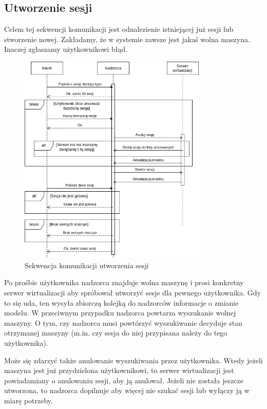 \documentclass[../opis-rozwiazania.tex]{subfiles}
\begin{document}
\label{communication-sec}

\subsection{Utworzenie sesji}

Celem tej sekwencji komunikacji jest odnalezienie istniejącej już sesji lub stworzenie nowej.
Zakładamy, że w systemie zawsze jest jakaś wolna maszyna.
Inaczej zgłaszamy użytkownikowi błąd.

\begin{figure}[H]
    \centering
    \includegraphics[width=0.8\textwidth]{../diagrams/sequence_diagrams/tworzenie_sesji.png}
    \caption{Sekwencja komunikacji utworzenia sesji}
    \label{figure:diagrams:sequence_diagrams:tworzenie_sesji}
\end{figure}

Po prośbie użytkownika nadzorca znajduje wolna maszynę i prosi konkretny serwer wirtualizacji aby spróbował utworzyć sesje dla pewnego użytkownika.
Gdy to się uda, ten wysyła zbiorczą kolejką do nadzorców informacje o zmianie modelu.
W przeciwnym przypadku nadzorca powtarza wyszukanie wolnej maszyny.
O tym, czy nadzorca musi powtórzyć wyszukiwanie decyduje stan otrzymanej maszyny (m.in. czy sesja do niej przypisana należy do tego użytkownika).

Może się zdarzyć także anulowanie wyszukiwania przez użytkownika.
Wtedy jeżeli maszyna jest już przydzielona użytkownikowi, to serwer wirtualizacji jest powiadamiany o anulowaniu sesji, aby ją anulował.
Jeżeli nie została jeszcze utworzona, to nadzorca dopilnuje aby więcej nie szukać sesji lub wyłączy ją w miarę potrzeby.
\end{document}
